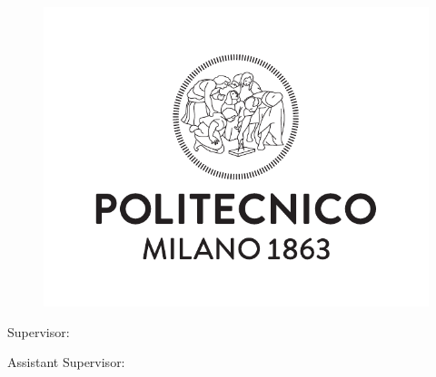 \begin{titlepage}
    \begin{center}
    	\large
        \spacedlowsmallcaps{\myUni} \\
        \bigskip\myFaculty \\
        \medskip\mySchool \\
    	\medskip\myDepartment \\
    	\bigskip\myCourseFirstPart \\
        \medskip\myCourseSecondPart \\

        \hfill

        \vfill

        \begin{figure}[!h]
			\begin{center}
				\includegraphics[width=0.3\columnwidth]{images/logoPoli.pdf}
			\end{center}
		\end{figure}

		\vfill

        \begingroup
       		\huge
            \color{Maroon} \myTitle
            \bigskip
        \endgroup

        \vfill

		\flushleft
		\normalsize{Supervisor:}\\
		\medskip\spacedlowsmallcaps{\mySupervisor}

		\flushleft
		\normalsize{Assistant Supervisor:}\\
		\medskip\spacedlowsmallcaps{\myOtherSupervisor}\\


\end{center}
\end{titlepage}
